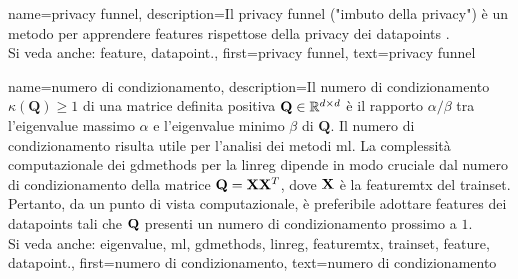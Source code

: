 {name={privacy funnel},
	description={Il privacy funnel ("imbuto della privacy") è un metodo per apprendere \glspl{feature} 
		rispettose della privacy dei \glspl{datapoint} \cite{PrivacyFunnel}.
				\\ 
		Si veda anche: \gls{feature}, \gls{datapoint}.},
 	first={privacy funnel},
	text={privacy funnel} 
}



{name={numero di condizionamento},
	description={Il numero di condizionamento $\kappa(\mathbf{Q}) \geq 1$ di una 
	matrice definita positiva $\mathbf{Q} \in \mathbb{R}^{d \times d}$ è il rapporto 
		$\alpha /\beta  $ tra l'\gls{eigenvalue} massimo $\alpha$ e l'\gls{eigenvalue} minimo $\beta$ di 
		$\mathbf{Q}$. Il numero di condizionamento risulta utile per l’analisi dei metodi \gls{ml}. 
		La complessità computazionale dei \gls{gdmethods} per la \gls{linreg} dipende in modo cruciale dal numero di 	
		condizionamento della matrice $\mathbf{Q} = {\bf X} {\bf X}^{T}$, dove ${\bf X}$ è la \gls{featuremtx} 
		del \gls{trainset}. Pertanto, da un punto di vista computazionale, è preferibile adottare \glspl{feature} dei 
		\glspl{datapoint} tali che $\mathbf{Q}$ presenti un numero di condizionamento prossimo a $1$.
					\\ 
		Si veda anche: \gls{eigenvalue}, \gls{ml}, \gls{gdmethods}, \gls{linreg}, \gls{featuremtx}, \gls{trainset}, \gls{feature}, \gls{datapoint}.},
	first={numero di condizionamento},
	text={numero di condizionamento} 
}

